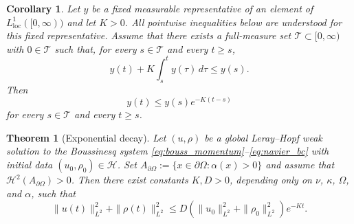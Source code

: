 \documentclass[10pt,a4paper]{amsart}
\newtheorem{theorem}{Theorem}
\newtheorem{corollary}{Corollary}
\begin{document}
\begin{corollary}\label{Acoro}
Let {$y$ be a fixed measurable representative of an element
of \(L^1_{\mathrm{loc}}([0,\infty))\)} and let $K>0$.
{All pointwise inequalities below are understood for this
fixed representative.} Assume that there exists a full-measure set $\mathcal T\subset[0,\infty)$ with $0\in\mathcal T$ such that, for every $s\in\mathcal T$ and every $t\ge s$,
\[
y(t)+K\int_s^t y(\tau)\,d\tau\le y(s).
\]
Then
\[
y(t)\le y(s)e^{-K(t-s)}
\]
for every $s\in\mathcal T$ and every $t\ge s$.
\end{corollary}

\begin{theorem}[Exponential decay] \label{thm:main}
Let $(u,\rho)$ be a global Leray--Hopf weak solution to the Boussinesq system \eqref{eq:bouss_momentum}--\eqref{eq:navier_bc} with initial data $(u_0,\rho_0)\in\mathcal H$. Set $A_{\partial\Omega}:=\{x\in\partial\Omega:\alpha(x)>0\}$ and assume that $\mathcal H^2(A_{\partial\Omega})>0$. Then there exist constants $K,D>0$, depending only on $\nu$, $\kappa$, $\Omega$, and $\alpha$, such that 
\[
\| {u}(t)\|_{L^2}^2+\|\rho(t)\|_{L^2}^2\leq D\left(\|{u}_0\|_{L^2}^2+\|\rho_0 \|_{L^2}^2\right) e^{-Kt}.
\]
\end{theorem}
\end{document}
